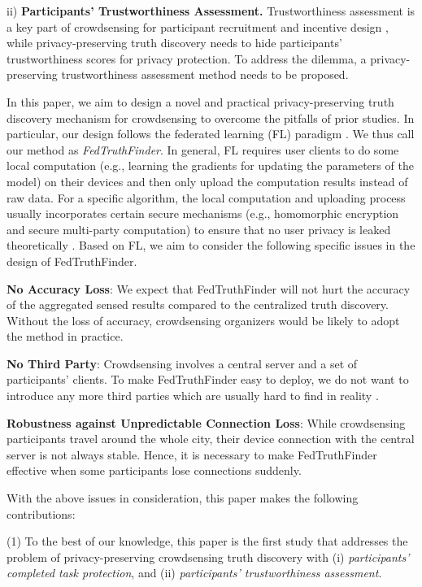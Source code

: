 \documentclass[11pt]{article}
\begin{document}
ii)  \textbf{Participants' Trustworthiness Assessment.} Trustworthiness assessment is a key part of crowdsensing for participant recruitment and incentive design \cite{Leye-Peng2018DataQG}, while privacy-preserving truth discovery needs to hide participants' trustworthiness scores for privacy protection. To address the dilemma, a privacy-preserving trustworthiness assessment method needs to be proposed.

In this paper, we aim to design a novel and practical privacy-preserving truth discovery mechanism for crowdsensing to overcome the pitfalls of prior studies. In particular, our design follows the federated learning (FL) paradigm \cite{Leye-konevcny2016federated,Leye-yang2019federated}. We thus call our method as \textit{FedTruthFinder}. In general, FL requires user clients to do some local computation (e.g., learning the gradients for updating the parameters of the model) on their devices and then only upload the computation results instead of raw data. For a specific algorithm, the local computation and uploading process usually incorporates certain secure mechanisms (e.g., homomorphic encryption and secure multi-party computation) to ensure that no user privacy is leaked theoretically \cite{Leye-chai2020secure,Leye-liu2020secure}.
Based on FL, we aim to consider the following specific issues in the design of FedTruthFinder.


\textbf{No Accuracy Loss}: We expect that FedTruthFinder will not hurt the accuracy of the aggregated sensed results compared to the centralized truth discovery. Without the loss of accuracy, crowdsensing organizers would be likely to adopt the method in practice.

\textbf{No Third Party}: Crowdsensing involves a central server and a set of participants' clients. To make FedTruthFinder easy to deploy, we do not want to introduce any more third parties which are usually hard to find in reality \cite{Leye-Bonawitz2017PracticalSA,Leye-Wang2017LocationPT}.


\textbf{Robustness against Unpredictable Connection Loss}: While crowdsensing participants travel around the whole city, their device connection with the central server is not always stable. Hence, it is necessary to make FedTruthFinder effective when some participants lose connections suddenly.



With the above issues in consideration, this paper makes the following contributions:

(1) To the best of our knowledge, this paper is the first study that addresses the problem of privacy-preserving crowdsensing truth discovery with (i) \textit{participants' completed task protection}, and (ii) \textit{participants' trustworthiness assessment}.
\end{document}
